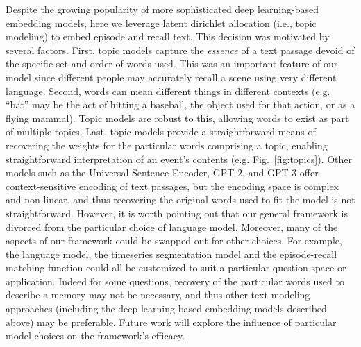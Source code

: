 

Despite the growing popularity of more sophisticated deep learning-based embedding models, here we leverage latent dirichlet allocation (i.e., topic modeling) to embed episode and recall text.  This decision was motivated by several factors.  First, topic models capture the \textit{essence} of a text passage devoid of the specific set and order of words used.  This was an important feature of our model since different people may accurately recall a scene using very different language. Second, words can mean different things in different contexts (e.g. ``bat'' may be the act of hitting a baseball, the object used for that action, or as a flying mammal).  Topic models are robust to this, allowing words to exist as part of multiple topics.  Last, topic models provide a straightforward means of recovering the weights for the particular words comprising a topic, enabling straightforward interpretation of an event's contents (e.g. Fig.~\ref{fig:topics}). Other models such as the Universal Sentence Encoder, GPT-2, and GPT-3 offer context-sensitive encoding of text passages, but the encoding space is complex and non-linear, and thus recovering the original words used to fit the model is not straightforward. However, it is worth pointing out that our general framework is divorced from the particular choice of language model. Moreover, many of the aspects of our framework could be swapped out for other choices. For example, the language model, the timeseries segmentation model and the episode-recall matching function could all be customized to suit a particular question space or application. Indeed for some questions, recovery of the particular words used to describe a memory may not be necessary, and thus other text-modeling approaches (including the deep learning-based embedding models described above) may be preferable. Future work will explore the influence of particular model choices on the framework's efficacy.

